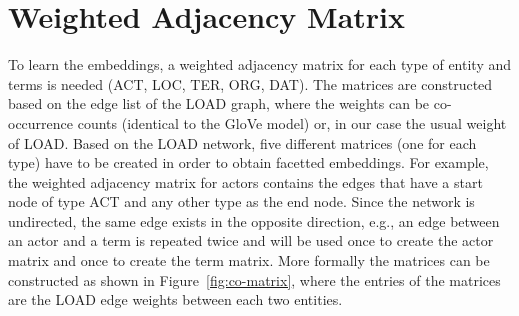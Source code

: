 \section{Weighted Adjacency Matrix}\label{sec:adj_matrix}
To learn the embeddings, a weighted adjacency matrix for each type of entity and terms is needed (ACT, LOC, TER, ORG, DAT). The matrices are constructed based on the edge list of the LOAD graph, where the weights can be co-occurrence counts (identical to the GloVe model) or, in our case the usual weight of LOAD. 
Based on the LOAD network, five different matrices (one for each type) have to be created in order to obtain facetted embeddings. For example, the weighted adjacency matrix for actors contains the edges that have a start node of type ACT and any other type as the end node. Since the network is undirected, the same edge exists in the opposite direction, e.g., an edge between an actor and a term is repeated twice and will be used once to create the actor matrix and once to create the term matrix. More formally the matrices can be constructed as shown in Figure~\ref{fig:co-matrix}, where the entries of the matrices are the LOAD edge weights between each two entities.  
